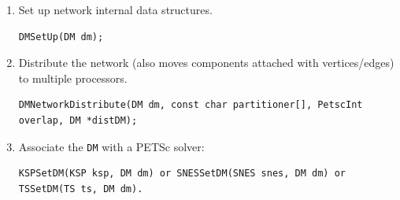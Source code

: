\begin{enumerate}
Alternatively, the number of variables can be set for a component directly. This allows much finer control, specifically for vertices/edges that have multiple components set on them.
\begin{lstlisting}
DMNetworkSetComponentNumVariables(DM dm, PetscInt p, PetscInt compnum, PetscInt nvar);
\end{lstlisting}

\item Set up network internal data structures.
\begin{lstlisting}
DMSetUp(DM dm);
\end{lstlisting}
  \item Distribute the network (also moves components attached with vertices/edges) to multiple processors.
\begin{lstlisting}
DMNetworkDistribute(DM dm, const char partitioner[], PetscInt overlap, DM *distDM);
\end{lstlisting}
\item Associate the \lstinline{DM} with a PETSc solver:
\begin{lstlisting}
KSPSetDM(KSP ksp, DM dm) or SNESSetDM(SNES snes, DM dm) or TSSetDM(TS ts, DM dm).
\end{lstlisting}
\end{enumerate}

